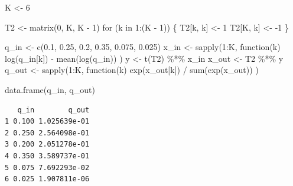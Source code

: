 \documentclass[
  letterpaper,
  DIV=11,
  numbers=noendperiod]{scrartcl}
\newenvironment{Shaded}{\begin{snugshade}}{\end{snugshade}}
\newcommand{\ControlFlowTok}[1]{\textcolor[rgb]{0.00,0.23,0.31}{#1}}
\newcommand{\DecValTok}[1]{\textcolor[rgb]{0.68,0.00,0.00}{#1}}
\newcommand{\FloatTok}[1]{\textcolor[rgb]{0.68,0.00,0.00}{#1}}
\newcommand{\FunctionTok}[1]{\textcolor[rgb]{0.28,0.35,0.67}{#1}}
\newcommand{\NormalTok}[1]{\textcolor[rgb]{0.00,0.23,0.31}{#1}}
\newcommand{\OtherTok}[1]{\textcolor[rgb]{0.00,0.23,0.31}{#1}}
\newcommand{\SpecialCharTok}[1]{\textcolor[rgb]{0.37,0.37,0.37}{#1}}
\begin{document}
\begin{Shaded}
\begin{Highlighting}[]
\NormalTok{K }\OtherTok{\textless{}{-}} \DecValTok{6}

\NormalTok{T2 }\OtherTok{\textless{}{-}} \FunctionTok{matrix}\NormalTok{(}\DecValTok{0}\NormalTok{, K, K }\SpecialCharTok{{-}} \DecValTok{1}\NormalTok{)}
\ControlFlowTok{for}\NormalTok{ (k }\ControlFlowTok{in} \DecValTok{1}\SpecialCharTok{:}\NormalTok{(K }\SpecialCharTok{{-}} \DecValTok{1}\NormalTok{)) \{}
\NormalTok{  T2[k, k] }\OtherTok{\textless{}{-}} \DecValTok{1}
\NormalTok{  T2[K, k] }\OtherTok{\textless{}{-}} \SpecialCharTok{{-}}\DecValTok{1}
\NormalTok{\}}

\NormalTok{q\_in }\OtherTok{\textless{}{-}} \FunctionTok{c}\NormalTok{(}\FloatTok{0.1}\NormalTok{, }\FloatTok{0.25}\NormalTok{, }\FloatTok{0.2}\NormalTok{, }\FloatTok{0.35}\NormalTok{, }\FloatTok{0.075}\NormalTok{, }\FloatTok{0.025}\NormalTok{)}
\NormalTok{x\_in }\OtherTok{\textless{}{-}} \FunctionTok{sapply}\NormalTok{(}\DecValTok{1}\SpecialCharTok{:}\NormalTok{K, }\ControlFlowTok{function}\NormalTok{(k) }\FunctionTok{log}\NormalTok{(q\_in[k]) }\SpecialCharTok{{-}} \FunctionTok{mean}\NormalTok{(}\FunctionTok{log}\NormalTok{(q\_in)) )}
\NormalTok{y }\OtherTok{\textless{}{-}} \FunctionTok{t}\NormalTok{(T2) }\SpecialCharTok{\%*\%}\NormalTok{ x\_in}
\NormalTok{x\_out }\OtherTok{\textless{}{-}}\NormalTok{ T2 }\SpecialCharTok{\%*\%}\NormalTok{ y}
\NormalTok{q\_out }\OtherTok{\textless{}{-}} \FunctionTok{sapply}\NormalTok{(}\DecValTok{1}\SpecialCharTok{:}\NormalTok{K, }\ControlFlowTok{function}\NormalTok{(k) }\FunctionTok{exp}\NormalTok{(x\_out[k]) }\SpecialCharTok{/} \FunctionTok{sum}\NormalTok{(}\FunctionTok{exp}\NormalTok{(x\_out)) )}

\FunctionTok{data.frame}\NormalTok{(q\_in, q\_out)}
\end{Highlighting}
\end{Shaded}

\begin{verbatim}
   q_in        q_out
1 0.100 1.025639e-01
2 0.250 2.564098e-01
3 0.200 2.051278e-01
4 0.350 3.589737e-01
5 0.075 7.692293e-02
6 0.025 1.907811e-06
\end{verbatim}
\end{document}
